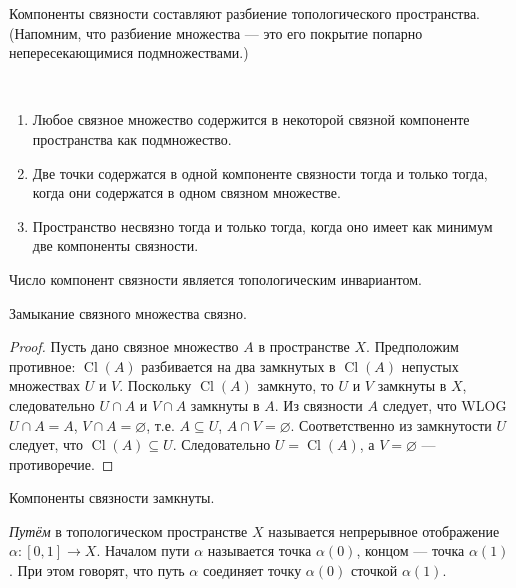 \documentclass[12pt,a4paper]{article}
\DeclareMathOperator{\Cl}{Cl}
\begin{document}
    \begin{corollary}
        Компоненты связности составляют разбиение топологического пространства. (Напомним, что разбиение множества --- это его покрытие попарно непересекающимися подмножествами.)
    \end{corollary}

    \begin{corollary}\ 
        \begin{enumerate}
            \item Любое связное множество содержится в некоторой связной компоненте пространства как подмножество.
            \item Две точки содержатся в одной компоненте связности тогда и только тогда, когда они содержатся в одном связном множестве.
            \item Пространство несвязно тогда и только тогда, когда оно имеет как минимум две компоненты связности.
        \end{enumerate}
    \end{corollary}

    \begin{corollary}
        Число компонент связности является топологическим инвариантом.
    \end{corollary}

    \begin{theorem}
        Замыкание связного множества связно.
    \end{theorem}

    \begin{proof}
        Пусть дано связное множество $A$ в пространстве $X$. Предположим противное: $\Cl(A)$ разбивается на два замкнутых в $\Cl(A)$ непустых множествах $U$ и $V$. Поскольку $\Cl(A)$ замкнуто, то $U$ и $V$ замкнуты в $X$, следовательно $U \cap A$ и $V \cap A$ замкнуты в $A$. Из связности $A$ следует, что WLOG $U \cap A = A$, $V \cap A = \varnothing$, т.е. $A \subseteq U$, $A \cap V = \varnothing$. Соответственно из замкнутости $U$ следует, что $\Cl(A) \subseteq U$. Следовательно $U = \Cl(A)$, а $V = \varnothing$ --- противоречие.
    \end{proof}

    \begin{corollary}
        Компоненты связности замкнуты.
    \end{corollary}

    \begin{definition}
        \emph{Путём} в топологическом пространстве $X$ называется непрерывное отображение $\alpha: [0,1] \to X$. Началом пути $\alpha$ называется точка $\alpha(0)$, концом --- точка $\alpha(1)$. При этом говорят, что путь $\alpha$ соединяет точку $\alpha(0)$ сточкой $\alpha(1)$.
    \end{definition}
\end{document}
